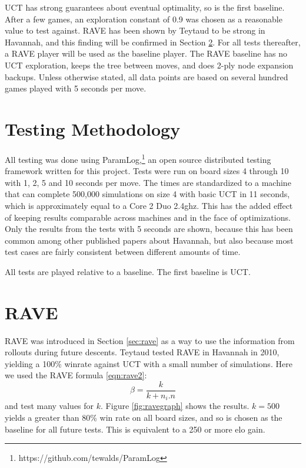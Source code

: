 UCT has strong guarantees about eventual optimality, so is the first baseline. After a few games, an exploration constant of 0.9 was chosen as a reasonable value to test against. RAVE has been shown by Teytaud to be strong in Havannah\cite{teytaud2010creating}, and this finding will be confirmed in Section \ref{sec:playingrave}. For all tests thereafter, a RAVE player will be used as the baseline player. The RAVE baseline has no UCT exploration, keeps the tree between moves, and does 2-ply node expansion backups. Unless otherwise stated, all data points are based on several hundred games played with 5 seconds per move.


\section{Testing Methodology}

All testing was done using ParamLog,\footnote{https://github.com/tewalds/ParamLog} an open source distributed testing framework written for this project. Tests were run on board sizes 4 through 10 with 1, 2, 5 and 10 seconds per move. The times are standardized to a machine that can complete 500,000 simulations on size 4 with basic UCT in 11 seconds, which is approximately equal to a Core 2 Duo 2.4ghz. This has the added effect of keeping results comparable across machines and in the face of optimizations. Only the results from the tests with 5 seconds are shown, because this has been common among other published papers about Havannah, but also because most test cases are fairly consistent between different amounts of time.

All tests are played relative to a baseline. The first baseline is UCT.


\section{RAVE}\label{sec:playingrave}

RAVE was introduced in Section \ref{sec:rave} as a way to use the information from rollouts during future descents. Teytaud tested RAVE in Havannah in 2010\cite{teytaud2010creating}, yielding a 100\% winrate against UCT with a small number of simulations. Here we used the RAVE formula \eqref{eqn:rave2}: $$ \beta = \frac{k}{k+n_i.n}$$ and test many values for $k$. Figure \ref{fig:ravegraph} shows the results. $k=500$ yields a greater than 80\% win rate on all board sizes, and so is chosen as the baseline for all future tests. This is equivalent to a 250 or more elo gain.


